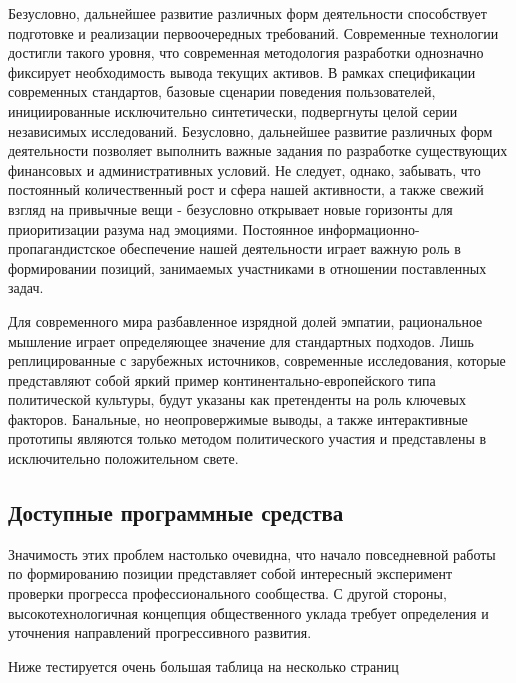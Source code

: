 \documentclass[a4paper,article,14pt]{extarticle}
\begin{document}
    Безусловно, дальнейшее развитие различных форм деятельности способствует подготовке и реализации первоочередных требований. Современные технологии достигли такого уровня, что современная методология разработки однозначно фиксирует необходимость вывода текущих активов. В рамках спецификации современных стандартов, базовые сценарии поведения пользователей, инициированные исключительно синтетически, подвергнуты целой серии независимых исследований. Безусловно, дальнейшее развитие различных форм деятельности позволяет выполнить важные задания по разработке существующих финансовых и административных условий. Не следует, однако, забывать, что постоянный количественный рост и сфера нашей активности, а также свежий взгляд на привычные вещи - безусловно открывает новые горизонты для приоритизации разума над эмоциями. Постоянное информационно-пропагандистское обеспечение нашей деятельности играет важную роль в формировании позиций, занимаемых участниками в отношении поставленных задач.

    Для современного мира разбавленное изрядной долей эмпатии, рациональное мышление играет определяющее значение для стандартных подходов. Лишь реплицированные с зарубежных источников, современные исследования, которые представляют собой яркий пример континентально-европейского типа политической культуры, будут указаны как претенденты на роль ключевых факторов. Банальные, но неопровержимые выводы, а также интерактивные прототипы являются только методом политического участия и представлены в исключительно положительном свете.

    \subsection{Доступные программные средства}

    Значимость этих проблем настолько очевидна, что начало повседневной работы по формированию позиции представляет собой интересный эксперимент проверки прогресса профессионального сообщества. С другой стороны, высокотехнологичная концепция общественного уклада требует определения и уточнения направлений прогрессивного развития.


    Ниже тестируется очень большая таблица на несколько страниц
\end{document}

